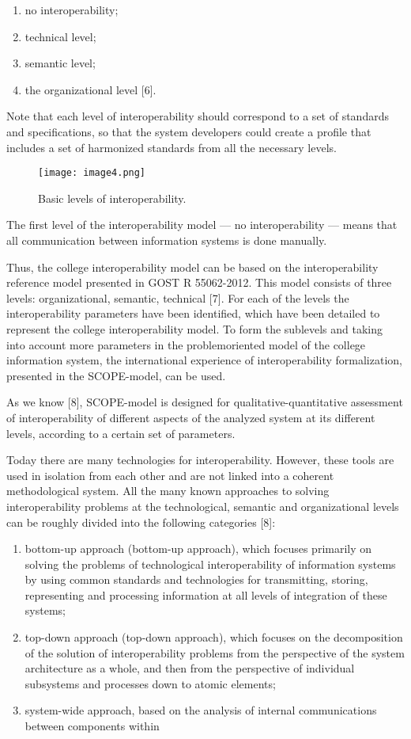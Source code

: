 \documentclass[10pt, a4paper]{article}
\begin{document}
\begin{multicols}{2}
\begin{enumerate}
  \item[1)] no interoperability;
  \item[2)] technical level;
  \item[3)] semantic level;
  \item[4)] the organizational level [6].
\end{enumerate} 
\par
Note that each level of interoperability should correspond to a set of standards and specifications, so that the
system developers could create a profile that includes a
set of harmonized standards from all the necessary levels.
\begin{figure}[H]
  \texttt{[image: image4.png]}
  \caption{Basic levels of interoperability.}
\end{figure}
\par
The first level of the interoperability model — no interoperability — means that all communication between
information systems is done manually.
\par
Thus, the college interoperability model can be based
on the interoperability reference model presented in
GOST R 55062-2012. This model consists of three
levels: organizational, semantic, technical [7]. For each
of the levels the interoperability parameters have been
identified, which have been detailed to represent the
college interoperability model. To form the sublevels and
taking into account more parameters in the problemoriented model of the college information system, the
international experience of interoperability formalization,
presented in the SCOPE-model, can be used.
\par
As we know [8], SCOPE-model is designed for
qualitative-quantitative assessment of interoperability of
different aspects of the analyzed system at its different
levels, according to a certain set of parameters.
\par
Today there are many technologies for interoperability.
However, these tools are used in isolation from each
other and are not linked into a coherent methodological
system. All the many known approaches to solving
interoperability problems at the technological, semantic
and organizational levels can be roughly divided into the
following categories [8]:
\begin{enumerate}

  \item[1)] bottom-up approach (bottom-up approach), which
focuses primarily on solving the problems of technological interoperability of information systems
by using common standards and technologies for
transmitting, storing, representing and processing
information at all levels of integration of these
systems;
  \item[2)] top-down approach (top-down approach), which
focuses on the decomposition of the solution of
interoperability problems from the perspective of
the system architecture as a whole, and then from
the perspective of individual subsystems and processes down to atomic elements;
  \item[3)]  system-wide approach, based on the analysis of internal communications between components within
\end{enumerate} 
\end{multicols}
\end{document}
